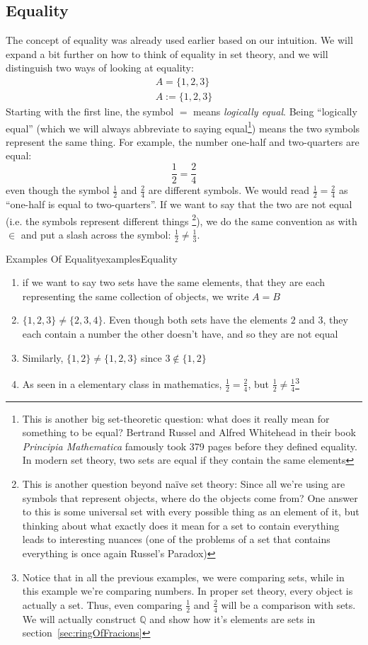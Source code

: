 \documentclass{book}
\newcommand{\Q}{{\mathbb{Q}}}
\begin{document}
\subsection*{Equality}

The concept of equality was already used earlier based on our intuition. We will expand a bit further on how to think of
equality in set theory, and we will distinguish two ways of looking at equality:
\begin{gather*}
	A = \{1,2,3\}\\
	A := \{1,2,3\}
\end{gather*}
Starting with the first line, the symbol $=$ means \emph{logically equal}.
Being ``logically equal'' (which we will always abbreviate to saying equal\footnote{This is another big set-theoretic question: what does it really
mean for something to be equal? Bertrand Russel and Alfred Whitehead in their book \emph{Principia Mathematica} famously
took 379 pages before they defined equality. In modern set theory, two sets are equal if they contain the same
elements}) means the two symbols represent the same thing. For example, the number
one-half and two-quarters are equal:
\[
	\frac{1}{2} = \frac{2}{4}
\]
even though the symbol $\frac{1}{2}$ and $\frac{2}{4}$ are different symbols. We would read $\frac{1}{2} = \frac{2}{4}$
as ``one-half is equal to two-quarters''. If we want to say that the two are not equal (i.e. the symbols represent
different things \footnote{This is another question beyond na\"ive set theory: Since all we're using are symbols that
represent objects, where do the objects come from? One answer to this is some universal set with every possible thing as
an element of it, but thinking about what exactly does it mean for a set to contain everything leads to interesting
nuances (one of the problems of a set that contains everything is once again Russel's Paradox)}), we do the same convention as
with $\in$ and put a slash across the symbol: $ \frac{1}{2} \ne  \frac{1}{3}$.

\begin{example}{Examples Of Equality}{examplesEquality}
	\begin{enumerate}
		\item if we want to say two sets have the same elements, that they are each representing the same collection of
			objects, we write $A = B$
		\item $\{1,2,3\} \ne \{2,3,4\}$. Even though both sets have the elements $2$ and $3$, they each contain a number
			the other doesn't have, and so they are not equal
		\item Similarly, $\{1,2\} \ne \{1,2,3\}$ since $3\notin \{1,2\}$
		\item As seen in a elementary class in mathematics, $ \frac{1}{2} = \frac{2}{4}$, but $\frac{1}{2} \ne
			\frac{1}{4}$\footnote{Notice that in all the previous examples, we were comparing sets, while in this
			example we're comparing numbers. In proper set theory, every object is actually a set. Thus, even comparing
			$\frac{1}{2}$ and $\frac{2}{4}$ will be a comparison with sets. We will actually construct $\Q$ and show how
			it's elements are sets in section~\ref{sec:ringOfFracions}}
	\end{enumerate}
\end{example}
\end{document}
